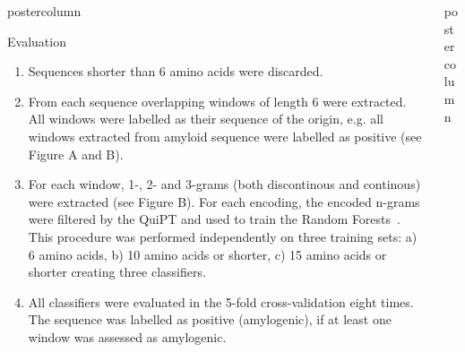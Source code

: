 \documentclass[final]{beamer}\usepackage[]{graphicx}\usepackage[]{color}
\newlength{\columnheight}
\begin{document}
\begin{frame}
\begin{columns}
\begin{column}{.485\textwidth}
\begin{beamercolorbox}[center,wd=\textwidth]{postercolumn}
\begin{minipage}[T]{.95\textwidth}
{\begin{block}{Evaluation}
\begin{enumerate}[1.]
\item Sequences shorter than 6 amino acids were discarded.
\item From each sequence overlapping windows of length 6 were extracted. All windows were labelled as their sequence of the origin, e.g. all windows extracted from amyloid sequence were labelled as positive (see Figure A and B).
\item For each window, 1-, 2- and 3-grams (both discontinous and continous) were extracted (see Figure B). For each encoding, the encoded n-grams were filtered by the QuiPT and used to train the Random Forests~\citep{liaw_classification_2002}. This procedure was performed independently on three training sets: a) 6 amino acids, b) 10 amino acids or shorter, c) 15 amino acids or shorter creating three classifiers.
\item All classifiers were evaluated in the 5-fold cross-validation eight times. The sequence was labelled as positive (amylogenic), if at least one window was assessed as amylogenic.
\end{enumerate}

\end{block}
\vfill



}
\end{minipage}
\end{beamercolorbox}
\end{column}



\begin{column}{.51\textwidth}
\begin{beamercolorbox}[center,wd=\textwidth]{postercolumn}
\begin{minipage}[T]{.95\textwidth}  
\parbox[t][\columnheight]{\textwidth}
{


}
\end{minipage}
\end{beamercolorbox}
\end{column}
\end{columns}
\end{frame}
\end{document}
